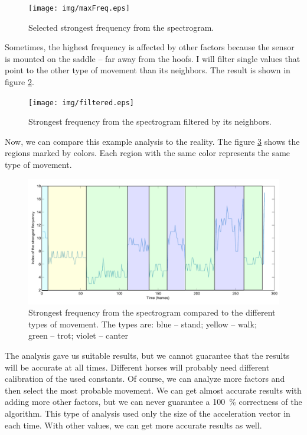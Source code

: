 \begin{figure}
    \centering
    \caption{Selected strongest frequency from the spectrogram.}
    \label{fig:spectralHighest}
    \texttt{[image: img/maxFreq.eps]}
\end{figure}

Sometimes, the highest frequency is affected by other factors because the sensor is mounted on the saddle -- far away from the hoofs. I will filter single values that point to the other type of movement than its neighbors. The result is shown in figure \ref{fig:spectralFiltered}.

\begin{figure}
    \centering
    \caption{Strongest frequency from the spectrogram filtered by its neighbors.}
    \label{fig:spectralFiltered}
    \texttt{[image: img/filtered.eps]}
\end{figure}

Now, we can compare this example analysis to the reality. The figure \ref{fig:spectralMarked} shows the regions marked by colors. Each region with the same color represents the same type of movement.

\begin{figure}
    \centering
    \caption{Strongest frequency from the spectrogram compared to the different types of movement. The types are: blue -- stand; yellow -- walk; green -- trot; violet -- canter}
    \label{fig:spectralMarked}
    \includegraphics[width=\linewidth]{img/filteredMarked.pdf}
\end{figure}

The analysis gave us suitable results, but we cannot guarantee that the results will be accurate at all times. Different horses will probably need different calibration of the used constants. Of course, we can analyze more factors and then select the most probable movement. We can get almost accurate results with adding more other factors, but we can never guarantee a \SI{100}{\%} correctness of the algorithm. This type of analysis used only the size of the acceleration vector in each time. With other values, we can get more accurate results as well.

